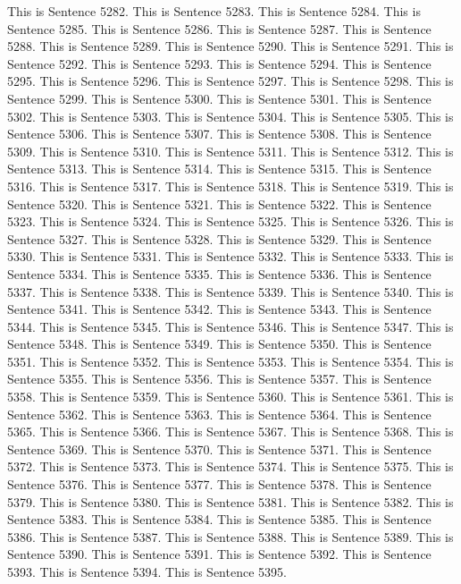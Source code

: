 \documentclass{article}
\begin{document}
This is Sentence 5282.
This is Sentence 5283.
This is Sentence 5284.
This is Sentence 5285.
This is Sentence 5286.
This is Sentence 5287.
This is Sentence 5288.
This is Sentence 5289.
This is Sentence 5290.
This is Sentence 5291.
This is Sentence 5292.
This is Sentence 5293.
This is Sentence 5294.
This is Sentence 5295.
This is Sentence 5296.
This is Sentence 5297.
This is Sentence 5298.
This is Sentence 5299.
This is Sentence 5300.
This is Sentence 5301.
This is Sentence 5302.
This is Sentence 5303.
This is Sentence 5304.
This is Sentence 5305.
This is Sentence 5306.
This is Sentence 5307.
This is Sentence 5308.
This is Sentence 5309.
This is Sentence 5310.
This is Sentence 5311.
This is Sentence 5312.
This is Sentence 5313.
This is Sentence 5314.
This is Sentence 5315.
This is Sentence 5316.
This is Sentence 5317.
This is Sentence 5318.
This is Sentence 5319.
This is Sentence 5320.
This is Sentence 5321.
This is Sentence 5322.
This is Sentence 5323.
This is Sentence 5324.
This is Sentence 5325.
This is Sentence 5326.
This is Sentence 5327.
This is Sentence 5328.
This is Sentence 5329.
This is Sentence 5330.
This is Sentence 5331.
This is Sentence 5332.
This is Sentence 5333.
This is Sentence 5334.
This is Sentence 5335.
This is Sentence 5336.
This is Sentence 5337.
This is Sentence 5338.
This is Sentence 5339.
This is Sentence 5340.
This is Sentence 5341.
This is Sentence 5342.
This is Sentence 5343.
This is Sentence 5344.
This is Sentence 5345.
This is Sentence 5346.
This is Sentence 5347.
This is Sentence 5348.
This is Sentence 5349.
This is Sentence 5350.
This is Sentence 5351.
This is Sentence 5352.
This is Sentence 5353.
This is Sentence 5354.
This is Sentence 5355.
This is Sentence 5356.
This is Sentence 5357.
This is Sentence 5358.
This is Sentence 5359.
This is Sentence 5360.
This is Sentence 5361.
This is Sentence 5362.
This is Sentence 5363.
This is Sentence 5364.
This is Sentence 5365.
This is Sentence 5366.
This is Sentence 5367.
This is Sentence 5368.
This is Sentence 5369.
This is Sentence 5370.
This is Sentence 5371.
This is Sentence 5372.
This is Sentence 5373.
This is Sentence 5374.
This is Sentence 5375.
This is Sentence 5376.
This is Sentence 5377.
This is Sentence 5378.
This is Sentence 5379.
This is Sentence 5380.
This is Sentence 5381.
This is Sentence 5382.
This is Sentence 5383.
This is Sentence 5384.
This is Sentence 5385.
This is Sentence 5386.
This is Sentence 5387.
This is Sentence 5388.
This is Sentence 5389.
This is Sentence 5390.
This is Sentence 5391.
This is Sentence 5392.
This is Sentence 5393.
This is Sentence 5394.
This is Sentence 5395.
\end{document}
